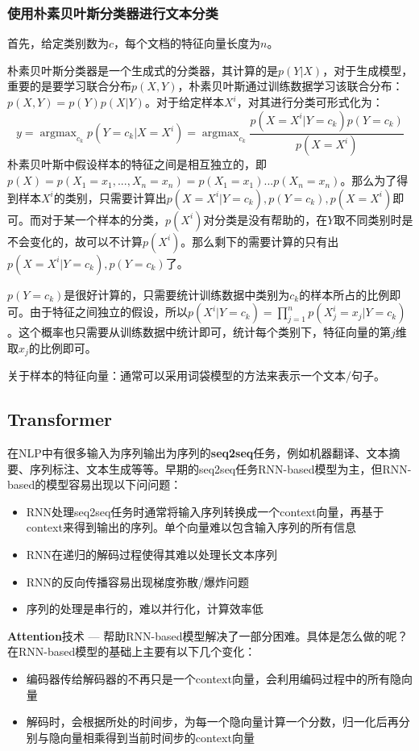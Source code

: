 \subsubsection{使用朴素贝叶斯分类器进行文本分类}
首先，给定类别数为$c$，每个文档的特征向量长度为$n$。

朴素贝叶斯分类器是一个生成式的分类器，其计算的是$p(Y | X)$，对于生成模型，重要的是要学习联合分布$p(X, Y)$，朴素贝叶斯通过训练数据学习该联合分布：$p(X, Y) = p(Y)p(X|Y)$。对于给定样本$X^i$，对其进行分类可形式化为：
$$
y = \mathop{argmax}_{c_k} p(Y=c_k | X=X^i) = \mathop{argmax}_{c_k} \frac{p(X=X^i | Y=c_k) p(Y=c_k)}{p(X=X^i)}
$$
朴素贝叶斯中假设样本的特征之间是相互独立的，即$p(X)=p(X_1=x_1, ..., X_n=x_n) = p(X_1=x_1) ... p(X_n=x_n)$。那么为了得到样本$X^i$的类别，只需要计算出$p(X=X^i | Y=c_k),  p(Y=c_k), p(X=X^i)$即可。而对于某一个样本的分类，$p(X^i)$对分类是没有帮助的，在$Y$取不同类别时是不会变化的，故可以不计算$p(X^i)$。那么剩下的需要计算的只有出$p(X=X^i | Y=c_k),  p(Y=c_k)$了。

$p(Y=c_k)$是很好计算的，只需要统计训练数据中类别为$c_k$的样本所占的比例即可。由于特征之间独立的假设，所以$p(X^i | Y=c_k) = \prod_{j=1}^{n} p(X_{j}^{i}=x_j | Y=c_k)$。这个概率也只需要从训练数据中统计即可，统计每个类别下，特征向量的第$j$维取$x_j$的比例即可。

关于样本的特征向量：通常可以采用词袋模型的方法来表示一个文本/句子。

\subsection{Transformer}
在NLP中有很多输入为序列输出为序列的\textbf{seq2seq}任务，例如机器翻译、文本摘要、序列标注、文本生成等等。早期的seq2seq任务RNN-based\cite{sutskever2014sequence, cho2014learning}模型为主，但RNN-based的模型容易出现以下问问题：
\begin{itemize}
	\item RNN处理seq2seq任务时通常将输入序列转换成一个context向量，再基于context来得到输出的序列。单个向量难以包含输入序列的所有信息
	\item RNN在递归的解码过程使得其难以处理长文本序列
	\item RNN的反向传播容易出现梯度弥散/爆炸问题
	\item 序列的处理是串行的，难以并行化，计算效率低
\end{itemize}
\textbf{Attention}\cite{bahdanau2016neural, luong2015effective}技术 --- 帮助RNN-based模型解决了一部分困难。具体是怎么做的呢？在RNN-based模型的基础上主要有以下几个变化：
\begin{itemize}
	\item 编码器传给解码器的不再只是一个context向量，会利用编码过程中的所有隐向量
	\item 解码时，会根据所处的时间步，为每一个隐向量计算一个分数，归一化后再分别与隐向量相乘得到当前时间步的context向量
\end{itemize}

